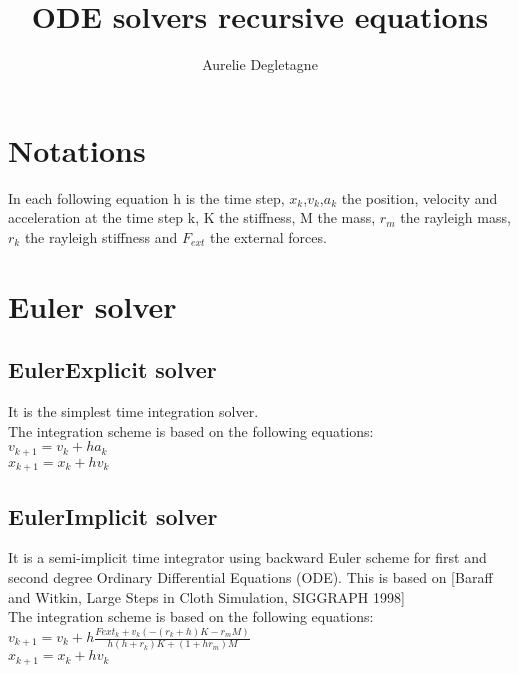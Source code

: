 \documentclass[12pt]{article}
\title{ODE solvers recursive equations}
\author{Aurelie Degletagne}
\begin{document}
\begin{doublespace}

\maketitle
\tableofcontents

\section{Notations}
In each following equation h is the time step, $x_{k}$,$v_{k}$,$a_{k}$   the position, velocity and acceleration at the time step k, K the stiffness, M the mass, $r_{m}$ the rayleigh mass, $r_{k}$ the rayleigh stiffness and $F_{ext}$ the external forces.

\section{Euler solver}

\subsection{EulerExplicit solver}
It is the simplest time integration solver.
\\The integration scheme is based on the following equations:
\\$ v_{k+1} = v_{k}+ha_{k} $
\\$ x_{k+1} = x_{k}+hv_{k} $

\subsection{EulerImplicit solver}
It is a semi-implicit time integrator using backward Euler scheme for first and second degree Ordinary Differential Equations (ODE). 
This is based on [Baraff and Witkin, Large Steps in Cloth Simulation, SIGGRAPH 1998]
\\ The integration scheme is based on the following equations:
\\$ v_{k+1} = v_{k}+h\frac{Fext_{k}+v_{k}(-(r_{k}+h)K-r_{m}M)}{h(h+r_{k})K+(1+hr_{m})M} $
\\$ x_{k+1} = x_{k}+hv_{k} $


\end{doublespace}
\end{document}
